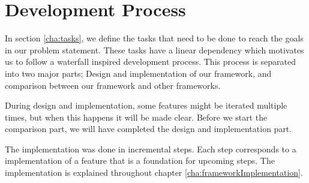 \section{Development Process}\label{cha:developmentProcess}
In section \ref{cha:tasks}, we define the tasks that need to be done to reach the goals in our problem statement. These tasks have a linear dependency which motivates us to follow a waterfall inspired development process. This process is separated into two major parts; Design and implementation of our framework, and comparison between our framework and other frameworks. 

During design and implementation, some features might be iterated multiple times, but when this happens it will be made clear. Before we start the comparison part, we will have completed the design and implementation part.

The implementation was done in incremental steps. Each step corresponds to a implementation of a feature that is a foundation for upcoming steps. The implementation is explained throughout chapter \ref{cha:frameworkImplementation}.

